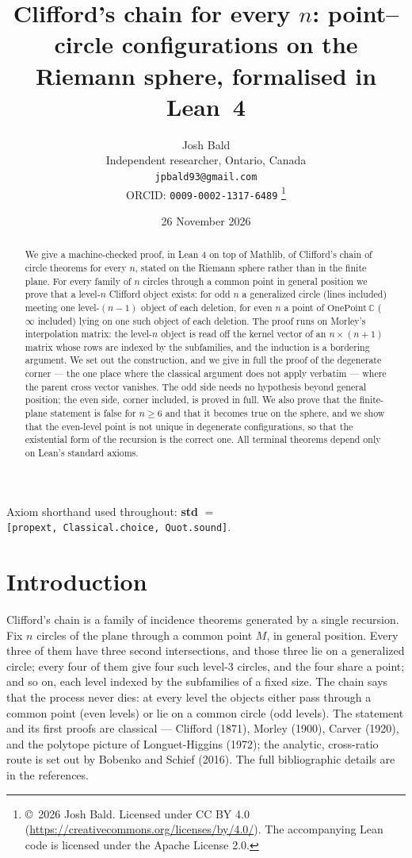 \documentclass[11pt]{article}
\title{Clifford's chain for every $n$: point--circle configurations on the Riemann sphere, formalised in Lean~4}
\author{Josh Bald\\ \small Independent researcher, Ontario, Canada\\ \small\texttt{jpbald93@gmail.com}\\
\small ORCID: \texttt{0009-0002-1317-6489}
\thanks{\copyright~2026 Josh Bald. Licensed under CC BY 4.0
(\url{https://creativecommons.org/licenses/by/4.0/}). The accompanying Lean code is licensed under
the Apache License 2.0.}}
\date{26 November 2026}
\theoremstyle{definition}
\theoremstyle{remark}
\begin{document}
\sloppy
\maketitle

\begin{abstract}
We give a machine-checked proof, in Lean 4 on top of Mathlib, of Clifford's chain of
circle theorems for every \(n\), stated on the Riemann sphere rather than in the finite plane. For every
family of \(n\) circles through a common point in general position we prove that a level-\(n\) Clifford
object exists: for odd \(n\) a generalized circle (lines included) meeting one level-\((n-1)\) object of
each deletion, for even \(n\) a point of \(\mathrm{OnePoint}\,\mathbb{C}\) ($\infty$ included) lying on one such
object of each deletion. The proof runs on Morley's interpolation matrix: the level-\(n\) object is read
off the kernel vector of an \(n \times (n+1)\) matrix whose rows are indexed by the subfamilies, and the
induction is a bordering argument. We set out the construction, and we give in full the proof of the
degenerate corner --- the one place where the classical argument does not apply verbatim --- where the
parent cross vector vanishes. The odd side needs no hypothesis beyond general position; the even side,
corner included, is proved in full. We also prove that the finite-plane statement is false for
\(n \ge 6\) and that it becomes true on the sphere, and we show that the even-level point is not unique
in degenerate configurations, so that the existential form of the recursion is the correct one. All
terminal theorems depend only on Lean's standard axioms.
\end{abstract}

Axiom shorthand used throughout: \textbf{std} \(=\) \texttt{{[}propext,\ Classical.choice,\ Quot.sound{]}}.


\hypertarget{introduction}{%
\section{Introduction}\label{introduction}}

Clifford's chain is a family of incidence theorems generated by a single recursion. Fix \(n\) circles of
the plane through a common point \(M\), in general position. Every three of them have three second
intersections, and those three lie on a generalized circle; every four of them give four such level-3
circles, and the four share a point; and so on, each level indexed by the subfamilies of a fixed size.
The chain says that the process never dies: at every level the objects either pass through a common
point (even levels) or lie on a common circle (odd levels). The statement and its first proofs are
classical --- Clifford (1871), Morley (1900), Carver (1920), and the polytope picture of Longuet-Higgins
(1972); the analytic, cross-ratio route is set out by Bobenko and Schief (2016). The full bibliographic
details are in the references.
\end{document}
